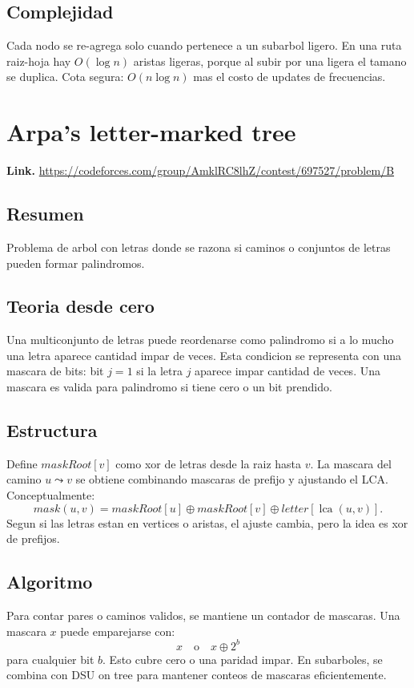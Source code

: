 \documentclass[10pt]{article}
\newcommand{\bigO}{O}
\newcommand{\lca}{\operatorname{lca}}
\begin{document}
\subsection*{Complejidad}
Cada nodo se re-agrega solo cuando pertenece a un subarbol ligero. En una ruta
raiz-hoja hay $\bigO(\log n)$ aristas ligeras, porque al subir por una ligera el
tamano se duplica. Cota segura: $\bigO(n\log n)$ mas el costo de updates de
frecuencias.

\clearpage
\section{Arpa's letter-marked tree}
\textbf{Link.} \url{https://codeforces.com/group/AmklRC8lhZ/contest/697527/problem/B}

\subsection*{Resumen}
Problema de arbol con letras donde se razona si caminos o conjuntos de letras
pueden formar palindromos.

\subsection*{Teoria desde cero}
Una multiconjunto de letras puede reordenarse como palindromo si a lo mucho una
letra aparece cantidad impar de veces. Esta condicion se representa con una
mascara de bits: bit $j=1$ si la letra $j$ aparece impar cantidad de veces.
Una mascara es valida para palindromo si tiene cero o un bit prendido.

\subsection*{Estructura}
Define $maskRoot[v]$ como xor de letras desde la raiz hasta $v$. La mascara del
camino $u\leadsto v$ se obtiene combinando mascaras de prefijo y ajustando el
LCA. Conceptualmente:
\[
mask(u,v)=maskRoot[u]\oplus maskRoot[v]\oplus letter[\lca(u,v)].
\]
Segun si las letras estan en vertices o aristas, el ajuste cambia, pero la idea
es xor de prefijos.

\subsection*{Algoritmo}
Para contar pares o caminos validos, se mantiene un contador de mascaras. Una
mascara $x$ puede emparejarse con:
\[
x \quad \text{o} \quad x\oplus 2^b
\]
para cualquier bit $b$. Esto cubre cero o una paridad impar. En subarboles, se
combina con DSU on tree para mantener conteos de mascaras eficientemente.
\end{document}
